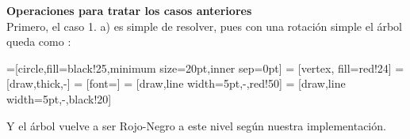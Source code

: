 \documentclass[dcc,sol]{fcfmcourse}
\begin{document}
\textbf{Operaciones para tratar los casos anteriores}\\
Primero, el caso 1. a) es simple de resolver, pues con una rotación simple el árbol queda como :\\
\begin{center}


=[circle,fill=black!25,minimum size=20pt,inner sep=0pt]
 = [vertex, fill=red!24]
 = [draw,thick,-]
 = [font=\small]
 = [draw,line width=5pt,-,red!50]
 = [draw,line width=5pt,-,black!20]


\end{center}
Y el árbol vuelve a ser Rojo-Negro a este nivel según nuestra implementación.\\
\end{document}
